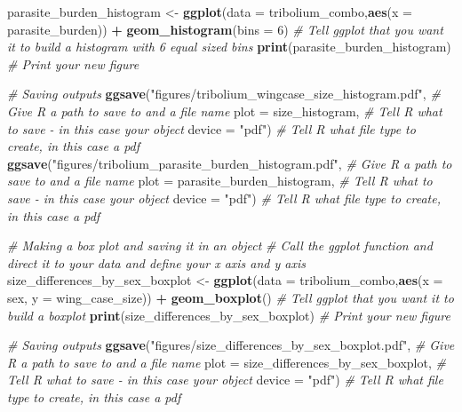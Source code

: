 \documentclass[
]{book}
\newenvironment{Shaded}{\begin{snugshade}}{\end{snugshade}}
\newcommand{\AttributeTok}[1]{\textcolor[rgb]{0.13,0.29,0.53}{#1}}
\newcommand{\CommentTok}[1]{\textcolor[rgb]{0.56,0.35,0.01}{\textit{#1}}}
\newcommand{\DecValTok}[1]{\textcolor[rgb]{0.00,0.00,0.81}{#1}}
\newcommand{\FunctionTok}[1]{\textcolor[rgb]{0.13,0.29,0.53}{\textbf{#1}}}
\newcommand{\NormalTok}[1]{#1}
\newcommand{\OtherTok}[1]{\textcolor[rgb]{0.56,0.35,0.01}{#1}}
\newcommand{\SpecialCharTok}[1]{\textcolor[rgb]{0.81,0.36,0.00}{\textbf{#1}}}
\newcommand{\StringTok}[1]{\textcolor[rgb]{0.31,0.60,0.02}{#1}}
\begin{document}
\begin{Shaded}
\begin{Highlighting}[]
\NormalTok{parasite\_burden\_histogram }\OtherTok{\textless{}{-}} \FunctionTok{ggplot}\NormalTok{(}\AttributeTok{data =}\NormalTok{ tribolium\_combo,}\FunctionTok{aes}\NormalTok{(}\AttributeTok{x =}\NormalTok{ parasite\_burden)) }\SpecialCharTok{+} 
  \FunctionTok{geom\_histogram}\NormalTok{(}\AttributeTok{bins =} \DecValTok{6}\NormalTok{) }\CommentTok{\# Tell ggplot that you want it to build a histogram with 6 equal sized bins}
\FunctionTok{print}\NormalTok{(parasite\_burden\_histogram) }\CommentTok{\# Print your new figure}

\CommentTok{\# Saving outputs}
\FunctionTok{ggsave}\NormalTok{(}\StringTok{"figures/tribolium\_wingcase\_size\_histogram.pdf"}\NormalTok{, }\CommentTok{\# Give R a path to save to and a file name}
       \AttributeTok{plot =}\NormalTok{ size\_histogram, }\CommentTok{\# Tell R what to save {-} in this case your object}
       \AttributeTok{device =} \StringTok{"pdf"}\NormalTok{) }\CommentTok{\# Tell R what file type to create, in this case a pdf}
\FunctionTok{ggsave}\NormalTok{(}\StringTok{"figures/tribolium\_parasite\_burden\_histogram.pdf"}\NormalTok{, }\CommentTok{\# Give R a path to save to and a file name}
       \AttributeTok{plot =}\NormalTok{ parasite\_burden\_histogram, }\CommentTok{\# Tell R what to save {-} in this case your object}
       \AttributeTok{device =} \StringTok{"pdf"}\NormalTok{) }\CommentTok{\# Tell R what file type to create, in this case a pdf}

\CommentTok{\# Making a box plot and saving it in an object}
\CommentTok{\# Call the ggplot function and direct it to your data and define your x axis and y axis}
\NormalTok{size\_differences\_by\_sex\_boxplot }\OtherTok{\textless{}{-}} \FunctionTok{ggplot}\NormalTok{(}\AttributeTok{data =}\NormalTok{ tribolium\_combo,}\FunctionTok{aes}\NormalTok{(}\AttributeTok{x =}\NormalTok{ sex, }\AttributeTok{y =}\NormalTok{ wing\_case\_size)) }\SpecialCharTok{+} 
  \FunctionTok{geom\_boxplot}\NormalTok{() }\CommentTok{\# Tell ggplot that you want it to build a boxplot}
\FunctionTok{print}\NormalTok{(size\_differences\_by\_sex\_boxplot) }\CommentTok{\# Print your new figure}

\CommentTok{\# Saving outputs}
\FunctionTok{ggsave}\NormalTok{(}\StringTok{"figures/size\_differences\_by\_sex\_boxplot.pdf"}\NormalTok{, }\CommentTok{\# Give R a path to save to and a file name}
       \AttributeTok{plot =}\NormalTok{ size\_differences\_by\_sex\_boxplot, }\CommentTok{\# Tell R what to save {-} in this case your object}
       \AttributeTok{device =} \StringTok{"pdf"}\NormalTok{) }\CommentTok{\# Tell R what file type to create, in this case a pdf}


\end{Highlighting}
\end{Shaded}
\end{document}

